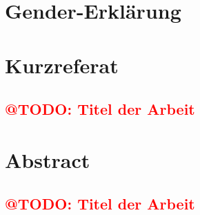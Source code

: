 \documentclass[a4paper,12pt, twoside]{scrreprt}
\begin{document}
\newpage
\section*{Gender-Erklärung}


%
%

\newpage
\section*{Kurzreferat}

\subsection*{\textcolor{red}{@TODO: Titel der Arbeit}}


\newpage
\section*{Abstract}
\subsection*{\textcolor{red}{@TODO: Titel der Arbeit}}

\end{document}

